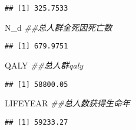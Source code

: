 \documentclass[
]{article}
\newenvironment{Shaded}{\begin{snugshade}}{\end{snugshade}}
\newcommand{\CommentTok}[1]{\textcolor[rgb]{0.56,0.35,0.01}{\textit{#1}}}
\newcommand{\NormalTok}[1]{#1}
\begin{document}
\begin{verbatim}
## [1] 325.7533
\end{verbatim}

\begin{Shaded}
\begin{Highlighting}[]
\NormalTok{N_d }\CommentTok{##总人群全死因死亡数}
\end{Highlighting}
\end{Shaded}

\begin{verbatim}
## [1] 679.9751
\end{verbatim}

\begin{Shaded}
\begin{Highlighting}[]
\NormalTok{QALY }\CommentTok{##总人群qaly}
\end{Highlighting}
\end{Shaded}

\begin{verbatim}
## [1] 58800.05
\end{verbatim}

\begin{Shaded}
\begin{Highlighting}[]
\NormalTok{LIFEYEAR  }\CommentTok{##总人数获得生命年}
\end{Highlighting}
\end{Shaded}

\begin{verbatim}
## [1] 59233.27
\end{verbatim}
\end{document}
